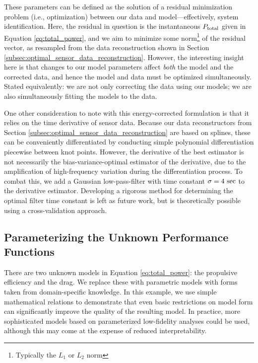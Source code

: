 These parameters can be defined as the solution of a residual minimization problem (i.e., optimization) between our data and model—effectively, system identification. Here, the residual in question is the instantaneous $P_{\rm total}$ given in Equation \ref{eq:total_power}, and we aim to minimize some norm\footnote{Typically the $L_1$ or $L_2$ norm} of the residual vector, as resampled from the data reconstruction shown in Section \ref{subsec:optimal_sensor_data_reconstruction}. However, the interesting insight here is that changes to our model parameters affect \emph{both} the model and the corrected data, and hence the model and data must be optimized simultaneously. Stated equivalently: we are not only correcting the data using our models; we are also simultaneously fitting the models to the data.

One other consideration to note with this energy-corrected formulation is that it relies on the time derivative of sensor data. Because our data reconstructors from Section \ref{subsec:optimal_sensor_data_reconstruction} are based on splines, these can be conveniently differentiated by conducting simple polynomial differentiation piecewise between knot points. However, the derivative of the best estimator is not necessarily the bias-variance-optimal estimator of the derivative, due to the amplification of high-frequency variation during the differentiation process. To combat this, we add a Gaussian low-pass-filter with time constant $\sigma=4\ \rm sec$ to the derivative estimator. Developing a rigorous method for determining the optimal filter time constant is left as future work, but is theoretically possible using a cross-validation approach.

\subsection{Parameterizing the Unknown Performance Functions}
\label{subsec:modeling_unknown_functions}

There are two unknown models in Equation \ref{eq:total_power}: the propulsive efficiency and the drag. We replace these with parametric models with forms taken from domain-specific knowledge. In this example, we use simple mathematical relations to demonstrate that even basic restrictions on model form can significantly improve the quality of the resulting model. In practice, more sophisticated models based on parameterized low-fidelity analyses could be used, although this may come at the expense of reduced interpretability.

